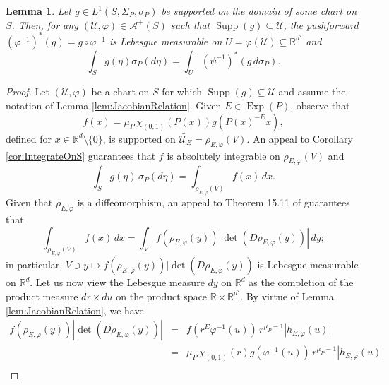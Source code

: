 \documentclass[11pt]{article}
\newtheorem{lemma}[theorem]{Lemma}
\theoremstyle{remark}
\newcommand\Exp{\operatorname{Exp}}
\newcommand\supp{\operatorname{Supp}}
\renewcommand\det{\operatorname{det}}
\begin{document}
\begin{lemma}\label{lem:LocalIntegralFormula}
Let $g\in L^1(S,\Sigma_P,\sigma_P)$ be supported on the domain of some chart on $S$. Then, for any $(\mathcal{U},\varphi)\in\mathcal{A}^+(S)$ such that $\supp(g)\subseteq\mathcal{U}$, the pushforward $(\varphi^{-1})^*(g)=g\circ\varphi^{-1}$ is Lebesgue measurable on $U=\varphi(\mathcal{U})\subseteq\mathbb{R}^{d'}$ and 
\begin{equation*}
\int_S g(\eta)\sigma_P(d\eta)=\int_{U}(\psi^{-1})^*(g\, d\sigma_P).
\end{equation*}
\end{lemma}
\begin{proof}
Let $(\mathcal{U},\varphi)$ be a chart on $S$ for which $\supp(g)\subseteq \mathcal{U}$ and assume the notation of Lemma \ref{lem:JacobianRelation}. Given $E\in\Exp(P)$, observe that
\begin{equation*}
    f(x)=\mu_P\, \chi_{(0,1)}(P(x))g(P(x)^{-E}x),
\end{equation*}
defined for $x\in\mathbb{R}^d\setminus\{0\}$, is supported on $\widetilde{\mathcal{U}_E}=\rho_{E,\varphi}(V)$. An appeal to Corollary \ref{cor:IntegrateOnS} guarantees that $f$ is absolutely integrable on $\rho_{E,\varphi}(V)$ and
\begin{equation}\label{eq:LocalIntegralFormula1}
\int_S g(\eta)\,\sigma_P(d\eta)=\int_{\rho_{E,\varphi}(V)}f(x)\,dx.
\end{equation}
Given that $\rho_{E,\varphi}$ is a diffeomorphism, an appeal to Theorem 15.11 of \cite{apostol_mathematical_1974} guarantees that
\begin{equation}\label{eq:LocalIntegralFormula2}
\int_{\rho_{E,\varphi}(V)}f(x)\,dx=\int_V f(\rho_{E,\varphi}(y))|\det(D\rho_{E,\varphi}(y))|\,dy;
\end{equation}
in particular, $V\ni y\mapsto f(\rho_{E,\varphi}(y))|\det(D\rho_{E,\varphi}(y))$ is Lebesgue measurable on $\mathbb{R}^{d}$. Let us now view the Lebesgue measure $dy$ on $\mathbb{R}^d$ as the completion of the product measure $dr\times du$ on the product space $\mathbb{R}\times\mathbb{R}^{d'}$. By virtue of Lemma \ref{lem:JacobianRelation}, we have
\begin{eqnarray}\label{eq:LocalIntegralFormula3}\nonumber
    f(\rho_{E,\varphi}(y))|\det(D\rho_{E,\varphi}(y))|
    &=& f(r^E\varphi^{-1}(u))\,r^{\mu_{P}-1}|h_{E,\varphi}(u)|\\ \nonumber
    &=& \mu_P\,\chi_{(0,1)}(r)g(\varphi^{-1}(u))\, r^{\mu_P-1}|h_{E,\varphi}(u)|\\ 

\end{eqnarray}
\end{proof}
\end{document}
